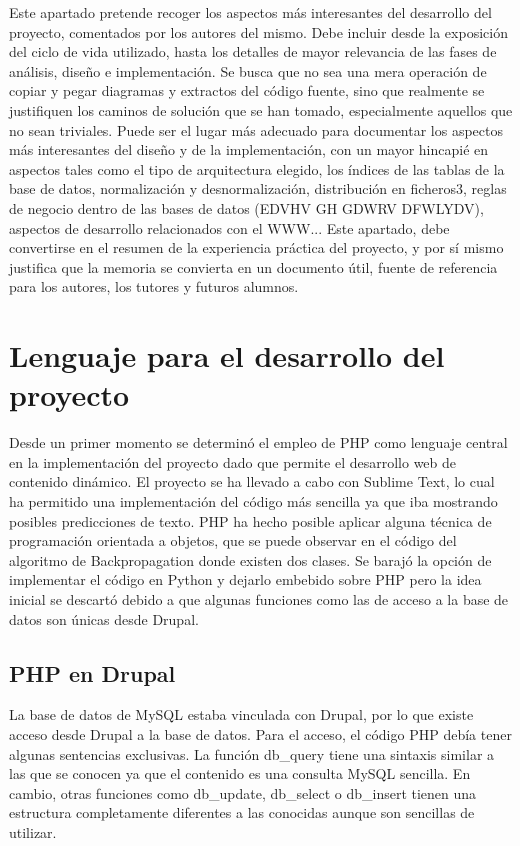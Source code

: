 
Este apartado pretende recoger los aspectos más interesantes del desarrollo del proyecto, comentados por los autores del mismo.
Debe incluir desde la exposición del ciclo de vida utilizado, hasta los detalles de mayor relevancia de las fases de análisis, diseño e implementación.
Se busca que no sea una mera operación de copiar y pegar diagramas y extractos del código fuente, sino que realmente se justifiquen los caminos de solución que se han tomado, especialmente aquellos que no sean triviales.
Puede ser el lugar más adecuado para documentar los aspectos más interesantes del diseño y de la implementación, con un mayor hincapié en aspectos tales como el tipo de arquitectura elegido, los índices de las tablas de la base de datos, normalización y desnormalización, distribución en ficheros3, reglas de negocio dentro de las bases de datos (EDVHV GH GDWRV DFWLYDV), aspectos de desarrollo relacionados con el WWW...
Este apartado, debe convertirse en el resumen de la experiencia práctica del proyecto, y por sí mismo justifica que la memoria se convierta en un documento útil, fuente de referencia para los autores, los tutores y futuros alumnos.

\section{Lenguaje para el desarrollo del proyecto}

Desde un primer momento se determinó el empleo de PHP como lenguaje central en la implementación del proyecto dado que permite el desarrollo web de contenido dinámico. El proyecto se ha llevado a cabo con Sublime Text, lo cual ha permitido una implementación del código más sencilla ya que iba mostrando posibles predicciones de texto.
PHP ha hecho posible aplicar alguna técnica de programación orientada a objetos, que se puede observar en el código del algoritmo de Backpropagation donde existen dos clases.
Se barajó la opción de implementar el código en Python y dejarlo embebido sobre PHP pero la idea inicial se descartó debido a que algunas funciones como las de acceso a la base de datos son únicas desde Drupal.

\subsection{PHP en Drupal}
La base de datos de MySQL estaba vinculada con Drupal, por lo que existe acceso desde Drupal a la base de datos. Para el acceso, el código PHP debía tener algunas sentencias exclusivas. La función db\_query tiene una sintaxis similar a las que se conocen ya que el contenido es una consulta MySQL sencilla. En cambio, otras funciones como db\_update, db\_select o db\_insert tienen una estructura completamente diferentes a las conocidas aunque son sencillas de utilizar.

